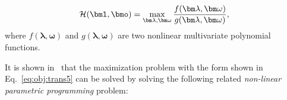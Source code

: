 \begin{equation}
\label{eq:obj:trans5}
\mathcal{H}(\bml, \bmo) = \max_{\bm \lambda, \bm \omega} \frac{f(\bm \lambda, \bm \omega)}{g(\bm \lambda, \bm \omega)},
\end{equation}
where
$f(\bm \lambda, \bm \omega)$ and $g(\bm \lambda, \bm \omega)$ are two nonlinear multivariate polynomial functions.

It is shown in~\cite{dinkelbach1967nonlinear} that the maximization problem with the form shown in Eq.~\ref{eq:obj:trans5} can be solved by solving the following
related {\it non-linear parametric programming} problem:
%
